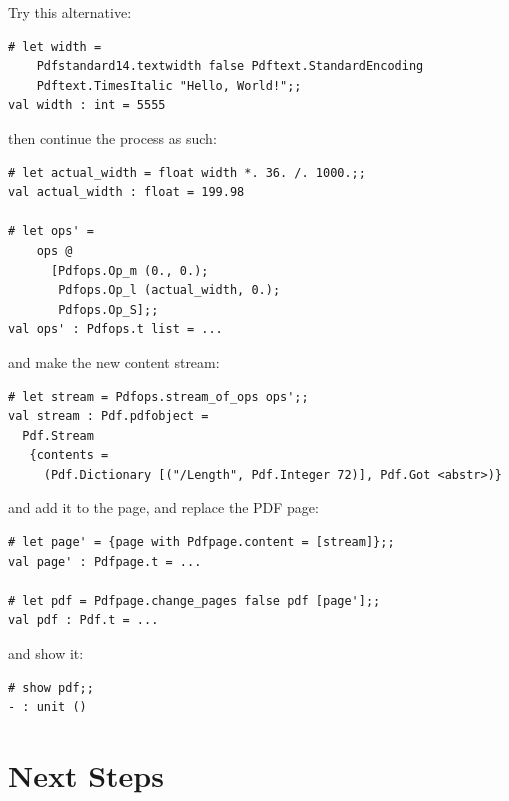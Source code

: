 \documentclass[a4paper]{memoir}
\begin{document}
\noindent Try this alternative:

\begin{framed}
\small\begin{verbatim}
# let width = 
    Pdfstandard14.textwidth false Pdftext.StandardEncoding 
    Pdftext.TimesItalic "Hello, World!";;
val width : int = 5555
\end{verbatim}
\end{framed}

\noindent then continue the process as such:

\begin{framed}
\small\begin{verbatim}
# let actual_width = float width *. 36. /. 1000.;;
val actual_width : float = 199.98

# let ops' =
    ops @
      [Pdfops.Op_m (0., 0.);
       Pdfops.Op_l (actual_width, 0.);
       Pdfops.Op_S];;
val ops' : Pdfops.t list = ...
\end{verbatim}
\end{framed}

\noindent and make the new content stream:

\begin{framed}
\small\begin{verbatim}
# let stream = Pdfops.stream_of_ops ops';;
val stream : Pdf.pdfobject =
  Pdf.Stream
   {contents =
     (Pdf.Dictionary [("/Length", Pdf.Integer 72)], Pdf.Got <abstr>)}
\end{verbatim}
\end{framed}

\noindent and add it to the page, and replace the PDF page:

\begin{framed}
\small\begin{verbatim}
# let page' = {page with Pdfpage.content = [stream]};;
val page' : Pdfpage.t = ...

# let pdf = Pdfpage.change_pages false pdf [page'];;
val pdf : Pdf.t = ...
\end{verbatim}
\end{framed}
\noindent and show it:
\begin{framed}
\small\begin{verbatim}
# show pdf;;
- : unit ()
\end{verbatim}
\end{framed}

\clearpage

\section*{Next Steps}
\end{document}
